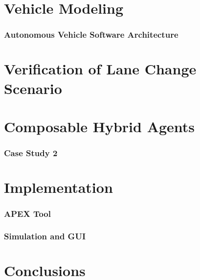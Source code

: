 \documentclass[11pt]{article}              %
\begin{document}
\part{Vehicle Modeling}
\section{Autonomous Vehicle Software Architecture}


\pagebreak


\part{Verification of Lane Change Scenario}


\pagebreak


\part{Composable Hybrid Agents}

\section{Case Study 2}
\pagebreak


\part{Implementation}
\section{APEX Tool}

\section{Simulation and GUI}
\pagebreak


\part{Conclusions}

\pagebreak





 
\end{document}
